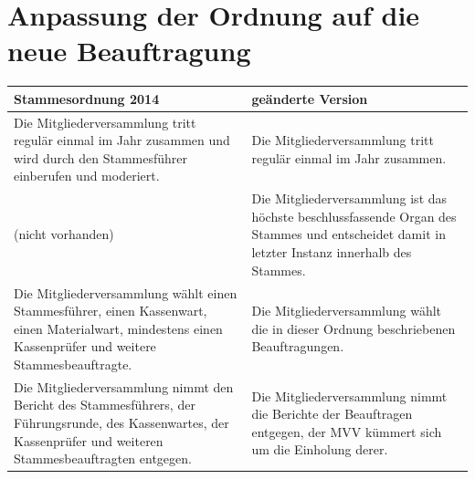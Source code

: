 \documentclass[a4paper]{article}
\begin{document}
\section{Anpassung der Ordnung auf die neue Beauftragung} %
\label{sec:anpassung_der_ordnung_auf_die_neue_beauftragung}

\begin{table}[h]
\def\arraystretch{1.3}
\center
\begin{tabular}{ p{}|p{}}
\textbf{Stammesordnung 2014}                                                                                                                                              & \textbf{geänderte Version}                                                                                                                             \\ \hline
Die Mitgliederversammlung tritt regulär einmal im Jahr zusammen und wird durch den Stammesführer einberufen und moderiert.                                       & Die Mitgliederversammlung tritt regulär einmal im Jahr zusammen.                                                                              \\\hline
(nicht vorhanden)                                                                                                                                                & Die Mitgliederversammlung ist das höchste beschlussfassende Organ des Stammes und entscheidet damit in letzter Instanz innerhalb des Stammes. \\\hline
Die Mitgliederversammlung wählt einen Stammesführer, einen Kassenwart, einen Materialwart, mindestens einen Kassenprüfer und weitere Stammesbeauftragte.         & Die Mitgliederversammlung wählt die in dieser Ordnung beschriebenen Beauftragungen.                                                           \\\hline
Die Mitgliederversammlung nimmt den Bericht des Stammesführers, der Führungsrunde, des Kassenwartes, der Kassenprüfer und weiteren Stammesbeauftragten entgegen. & Die Mitgliederversammlung nimmt die Berichte der Beauftragen entgegen, der MVV kümmert sich um die Einholung derer.                          
\end{tabular}
\end{table}
~\\[0.5cm]
\end{document}
